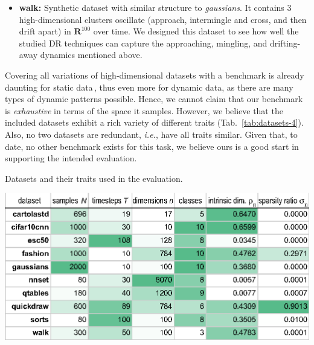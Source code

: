 \begin{itemize}
  \item \textbf{walk:} Synthetic dataset with similar structure to \emph{gaussians}. It contains 3 high-dimensional clusters oscillate (approach, intermingle and cross, and then drift apart) in $\mathbf{R}^{100}$ over time. We designed this dataset to see how well the studied DR techniques can capture the approaching, mingling, and drifting-away dynamics mentioned above.
\end{itemize}



Covering all variations of high-dimensional datasets with a benchmark is already daunting for static data\,\citep{Espadoto19}, thus even more for dynamic data, as there are many types of dynamic patterns possible. Hence, we cannot claim that our benchmark is \emph{exhaustive} in terms of the space it samples. However, we believe that the included datasets exhibit a rich variety of different traits (Tab.~\ref{tab:datasets-4}). Also, no two datasets are redundant, \emph{i.e.}, have all traits similar. Given that, to date, no other benchmark exists for this task, we believe ours is a good start in supporting the intended evaluation.

\begin{table}
\centering
\caption{Datasets and their traits used in the evaluation.}
\label{tab:datasets-4}
\vspace{-0.15cm}
\includegraphics[width=.99\linewidth]{figures/projection-evaluation/datasets.eps}
\vspace{-0.15cm}
\end{table}

